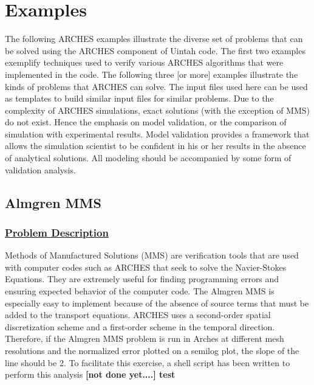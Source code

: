 
\newpage
\section{Examples}

The following ARCHES examples illustrate the diverse set of problems that can be solved using the ARCHES component of Uintah code.  The first two examples exemplify techniques used to verify various ARCHES algorithms that were implemented in the code.  The following three [or more] examples illustrate the kinds of problems that ARCHES can solve.  The input files used here can be used as templates to build similar input files for similar problems. 
Due to the complexity of ARCHES simulations, exact solutions (with the exception of MMS) do not exist.  Hence the emphasis on model validation, or the comparison of simulation with experimental results.  Model validation provides a framework that allows the simulation scientist to be confident in his or her results in the absence of analytical solutions.  All modeling should be accompanied by some form of validation analysis.


\subsection*{\center Almgren MMS}
\subsubsection*{\underline{Problem Description}}

Methods of Manufactured Solutions (MMS) are verification tools that are used with computer codes such as ARCHES that seek to solve the Navier-Stokes Equations.  They are extremely useful for finding programming errors and ensuring expected behavior of the computer code.   The Almgren MMS is especially easy to implement because of the absence of source terms that must be added to the transport equations.
ARCHES uses a second-order spatial discretization scheme and a first-order scheme in the temporal direction.  Therefore, if the Almgren MMS problem is run in Arches at different mesh resolutions and the normalized error plotted on a semilog plot, the slope of the line should be 2.  To facilitate this exercise, a shell script has been written to perform this analysis \bf{[not done yet....]}  test %

